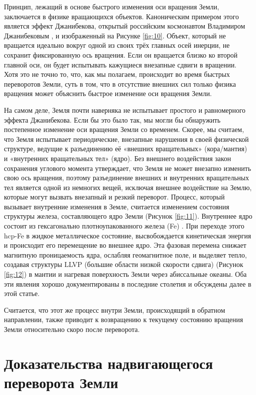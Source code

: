 \documentclass[10pt,twocolumn,letterpaper]{article}
\begin{document}
Принцип, лежащий в основе быстрого изменения оси вращения Земли, заключается в физике вращающихся объектов. Каноническим примером этого является эффект Джанибекова, открытый российским космонавтом Владимиром Джанибековым \cite{37}, и изображенный на Рисунке \ref{fig:10}. Объект, который не вращается идеально вокруг одной из своих трёх главных осей инерции, не сохранит фиксированную ось вращения. Если он вращается близко ко второй главной оси, он будет испытывать кажущиеся внезапные сдвиги в вращении. Хотя это не точно то, что, как мы полагаем, происходит во время быстрых переворотов Земли, суть в том, что в отсутствие внешних сил только физика вращения может объяснить быстрое изменение оси вращения Земли.

На самом деле, Земля почти наверняка не испытывает простого и равномерного эффекта Джанибекова. Если бы это было так, мы могли бы обнаружить постепенное изменение оси вращения Земли со временем. Скорее, мы считаем, что Земля испытывает периодические, внезапные нарушения в своей физической структуре, ведущие к разъединению её «внешних вращательных» (кора/мантия) и «внутренних вращательных тел» (ядро). Без внешнего воздействия закон сохранения углового момента утверждает, что Земля не может внезапно изменить свою ось вращения, поэтому разъединение внешних и внутренних вращательных тел является одной из немногих вещей, исключая внешнее воздействие на Землю, которые могут вызвать внезапный и резкий переворот.
Процесс, который вызывает внутренние изменения в Земле, считается изменением состояния структуры железа, составляющего ядро Земли (Рисунок \ref{fig:11}). Внутреннее ядро состоит из гексагонально плотноупакованного железа (Fe) \cite{141}. При переходе этого hcp-Fe в жидкое металлическое состояние, высвобождается кинетическая энергия и происходит его перемещение во внешнее ядро. Эта фазовая перемена снижает магнитную проницаемость ядра, ослабляя геомагнитное поле, и выделяет тепло, создавая структуры LLVP (большие области низкой скорости сдвига) (Рисунок \ref{fig:12}) \cite{38} в мантии и нагревая поверхность Земли через абиссальные океаны. Оба эти явления хорошо документированы в последние столетия и обсуждены далее в этой статье.

Считается, что этот же процесс внутри Земли, происходящий в обратном направлении, также приводит к возвращению к текущему состоянию вращения Земли относительно скоро после переворота.

\section{Доказательства надвигающегося переворота Земли}
\end{document}
